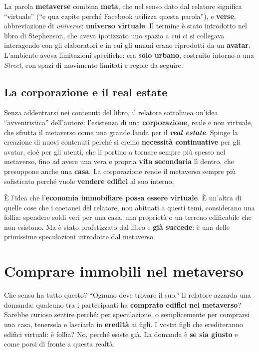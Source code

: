 La parola \textbf{metaverse} combina \textbf{meta}, che nel senso dato dal
relatore significa ``virtuale'' (``e qua capite perché Facebook utilizza questa
parola''), e \textbf{verse}, abbreviazione di \emph{universe}: \textbf{universo
virtuale}. Il termine è stato introdotto nel libro di Stephenson, che aveva
ipotizzato uno spazio a cui ci si collegava interagendo con gli elaboratori e in
cui gli umani erano riprodotti da un \textbf{avatar}. L'ambiente aveva
limitazioni specifiche: era \textbf{solo urbano}, costruito intorno a una
\emph{Street}, con spazi di movimento limitati e regole da seguire.

\subsection{La corporazione e il real estate}

Senza addentrarsi nei contenuti del libro, il relatore sottolinea un'idea
``avveniristica'' dell'autore: l'esistenza di una \textbf{corporazione}, reale e
non virtuale, che sfrutta il metaverso come una grande landa per il
\textbf{\emph{real estate}}. Spinge la creazione di nuovi contenuti perché si
creino \textbf{necessità continuative} per gli avatar, cioè per gli utenti, che
li portino a tornare sempre più spesso nel metaverso, fino ad avere una vera e
propria \textbf{vita secondaria} lì dentro, che presuppone anche una
\textbf{casa}. La corporazione rende il metaverso sempre più sofisticato perché
vuole \textbf{vendere edifici} al suo interno.

È l'idea che l'\textbf{economia immobiliare possa essere virtuale}. È un'altra
di quelle cose che i coetanei del relatore, non abituati a questi temi,
considerano una follia: spendere soldi veri per una casa, una proprietà o un
terreno edificabile che non esistono. Ma è stato profetizzato dal libro e
\textbf{già succede}: è una delle primissime speculazioni introdotte dal
metaverso.

\section{Comprare immobili nel metaverso}
\label{z8:sec:immobili}

Che senso ha tutto questo? ``Ognuno deve trovare il suo.'' Il relatore azzarda
una domanda: qualcuno tra i partecipanti ha \textbf{comprato edifici nel
metaverso}? Sarebbe curioso sentire perché: per speculazione, o semplicemente per
comprarsi una casa, tenersela e lasciarla in \textbf{eredità} ai figli. I vostri
figli che erediteranno edifici virtuali: è follia? No, perché esiste già. La
domanda è \textbf{se sia giusto} e come porsi di fronte a questa realtà.

